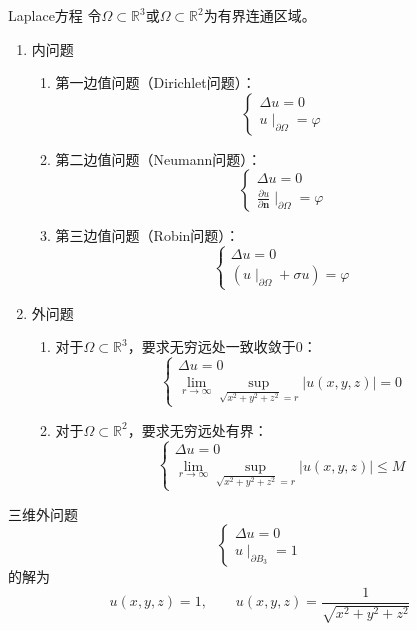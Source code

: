 \documentclass[lang = cn, scheme = chinese, thmcnt = section]{elegantbook}
\newcommand{\R}{\mathbb{R}}            %
\newcommand{\sub}{\subset}             %
\newcommand{\bs}{\boldsymbol}          %
\newcommand{\dis}{\displaystyle}
\begin{document}
\begin{definition}{Laplace方程}
	令$\Omega\sub\R^3$或$\Omega\sub\R^2$为有界连通区域。
	\begin{enumerate}
		\item 内问题
		\begin{enumerate}
			\item 第一边值问题（Dirichlet问题）：%
			$$
			\begin{cases}
				\Delta u=0\\
				u\mid_{\partial \Omega}=\varphi
			\end{cases}
			$$
			\item 第二边值问题（Neumann问题）：%
			$$
			\begin{cases}
				\Delta u=0\\
				\frac{\partial u}{\partial\bs{n}}\mid_{\partial \Omega}=\varphi
			\end{cases}
			$$
			\item 第三边值问题（Robin问题）：%
			$$
			\begin{cases}
				\Delta u=0\\
				\left(u\mid_{\partial \Omega}+\sigma u\right)=\varphi
			\end{cases}
			$$
		\end{enumerate}
		\item 外问题
		\begin{enumerate}
			\item 对于$\Omega\sub\R^3$，要求无穷远处一致收敛于$0$：
			$$
			\begin{cases}
				\Delta u=0\\
				\dis\lim_{r\to\infty}\sup_{\sqrt{x^2+y^2+z^2}=r}|u(x,y,z)|=0
			\end{cases}
			$$
			\item 对于$\Omega\sub\R^2$，要求无穷远处有界：
			$$
			\begin{cases}
				\Delta u=0\\
				\dis\lim_{r\to\infty}\sup_{\sqrt{x^2+y^2+z^2}=r}|u(x,y,z)|\le M
			\end{cases}
			$$
		\end{enumerate}
	\end{enumerate}
\end{definition}

\begin{example}
	三维外问题
	$$
	\begin{cases}
		\Delta u=0\\
		u\mid_{\partial B_3}=1
	\end{cases}
	$$
	的解为%
	$$
	u(x,y,z)=1,\qquad 
	u(x,y,z)=\frac{1}{\sqrt{x^2+y^2+z^2}}
	$$
\end{example}
\end{document}

